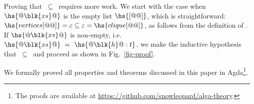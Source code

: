 Proving that  $\ \subseteq\ $  requires more work.
We start with the case when $\hs{@\blk{xs}@}$ is the empty list $\hs{[@@]}$,
which is straightforward:
$\hs{vertices [@@]} = \varepsilon \subseteq \varepsilon = \hs{clique [@@]}$,
as follows from the definition of .
If $\hs{@\blk{xs}@}$ is non-empty, i.e. $\hs{@\blk{xs}@}\ =\ \hs{@\blk{h}@:t}$,
we make the inductive hypothesis that
 $\ \subseteq\ $  and proceed as shown in Fig.~\ref{fig-proof}.

We formally proved all properties and theorems discussed in this paper in
Agda\footnote{The proofs are available at \url{https://github.com/snowleopard/alga-theory}.}.
